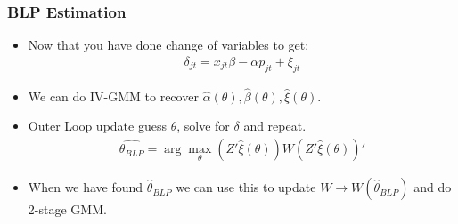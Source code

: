 \documentclass[xcolor=pdftex,dvipsnames,table,mathserif]{beamer}
\begin{document}
 \begin{frame}
\frametitle{BLP Estimation}
\begin{itemize}
 \item Now that you have done change of variables to get:
 \begin{eqnarray*}
\delta_{jt}= x_{jt} \beta -\alpha p_{jt}+  \xi_{jt}
 \end{eqnarray*}
 \item We can do IV-GMM to recover $\hat{\alpha}(\theta),\hat{\beta}(\theta),\hat{\xi}(\theta)$.
 \item Outer Loop update guess $\theta$, solve for $\delta$ and repeat.
 \begin{eqnarray*}
 \widehat{\theta_{BLP}} = \arg \max_{\theta} (Z' \hat{\xi}(\theta)) W  (Z' \hat{\xi}(\theta))'
 \end{eqnarray*}
 \item When we have found $\hat{\theta}_{BLP}$ we can use this to update $W \rightarrow W(\hat{\theta}_{BLP})$ and do 2-stage GMM.
 \end{itemize}
\end{frame}
\end{document}
